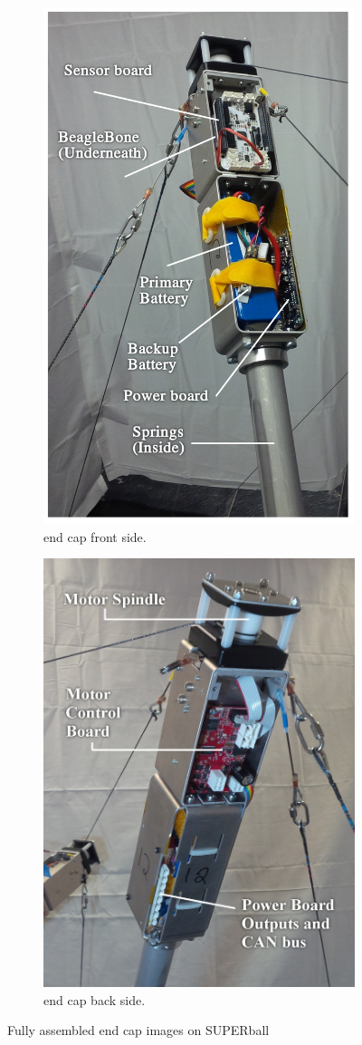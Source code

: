 \begin{figure}[thpb]
\begin{subfigure}{.5\textwidth}
      \centering
      \includegraphics[width=0.5\columnwidth]{tex/img/endcap_upclose_sensorboard_labelled_fixedfonts}
      \caption{end cap front side.}
      \label{fig:endcap_upclose_front}
\end{subfigure}
\begin{subfigure}{.5\textwidth}
      \centering
      \includegraphics[width=0.5\columnwidth]{tex/img/endcap_upclose_motorboard_labelled_fixedfonts}
      \caption{end cap back side.}
      \label{fig:endcap_upclose_back}
\end{subfigure}
\caption{Fully assembled end cap images on SUPERball}
\label{fig:fully_assembled_endcap}
\end{figure}

